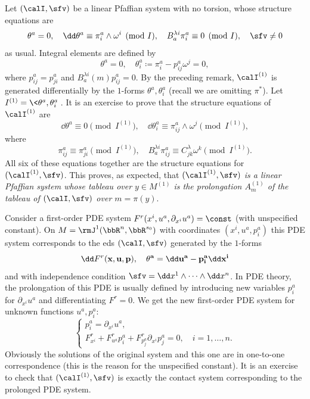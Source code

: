 \begin{example}
    Let $(\calI,\sfv)$ be a linear Pfaffian system with no torsion, whose structure equations are
    \[\theta^a=0,\quad \dd\theta^a\equiv \pi^a_i\wedge\omega^i\pmod{I},\quad B^{\lambda i}_a\pi^a_i\equiv 0\pmod{I},\quad \sfv\neq 0\]
    as usual. Integral elements are defined by 
    \[\theta^a=0,\quad \theta^a_i\coloneqq \pi^a_i-p^a_{ij}\omega^j=0,\]
    where $p^a_{ij}=p^a_{ji}$ and $B^{\lambda i}_a(m)p^a_{ij}=0$. By the preceding remark, $\calI^{(1)}$ is generated differentially by the $1$-forms $\theta^a,\theta^a_i$ (recall we are omitting $\pi^\ast$). Let $I^{(1)}=\<\theta^a,\theta^a_i\>$. It is an exercise to prove that the structure equations of $\calI^{(1)}$ are 
    \[\dd\theta^a\equiv 0\pmod{I^{(1)}},\quad \dd\theta^a_i\equiv \pi^a_{ij}\wedge\omega^j\pmod{I^{(1)}},\]
    where 
    \[\pi^a_{ij}\equiv \pi^a_{ji}\pmod{I^{(1)}},\quad B^{\lambda i}_a\pi^a_{ij}\equiv C^\lambda_{jk}\omega^k\pmod{I^{(1)}}.\]
    All six of these equations together are the structure equations for $(\calI^{(1)},\sfv)$. This proves, as expected, that \emph{$(\calI^{(1)},\sfv)$ is a linear Pfaffian system whose tableau over $y\in M^{(1)}$ is the prolongation $A_m^{(1)}$ of the tableau of $(\calI,\sfv)$ over $m=\pi(y)$}.
\end{example}

\begin{example}
    Consider a first-order PDE system $F^r(x^i,u^a,\partial_{x^i}u^a)=\const$ (with unspecified constant). On $M=\rmJ^1(\bbR^n,\bbR^{s_0})$ with coordinates $(x^i,u^a,p^a_i)$ this PDE system corresponds to the \gls{eds} $(\calI,\sfv)$ generated by the $1$-forms 
    \[\dd F^r(\bf{x},\bf{u},\bf{p}),\quad \theta^a=\dd u^a-p^a_i\dd x^i\]
    and with independence condition $\sfv=\dd x^1\wedge\cdots\wedge\dd x^n$. In PDE theory, the prolongation of this PDE is usually defined by introducing new variables $p^a_i$ for $\partial_{x^i}u^a$ and differentiating $F^r=0$. We get the new first-order PDE system for unknown functions $u^a,p^a_i$:
    \[\left\{
        \begin{array}{l}
            p^a_i=\partial_{x^i}u^a,\\ 
            F^r_{x^i}+F^r_{u^a}p^a_i+F^r_{p^a_j}\partial_{x^i}p^a_j=0, \quad i=1,\ldots,n.
        \end{array}
    \right.\]
    Obviously the solutions of the original system and this one are in one-to-one correspondence (this is the reason for the unspecified constant). It is an exercise to check that $(\calI^{(1)},\sfv)$ is exactly the contact system corresponding to the prolonged PDE system.
\end{example}

